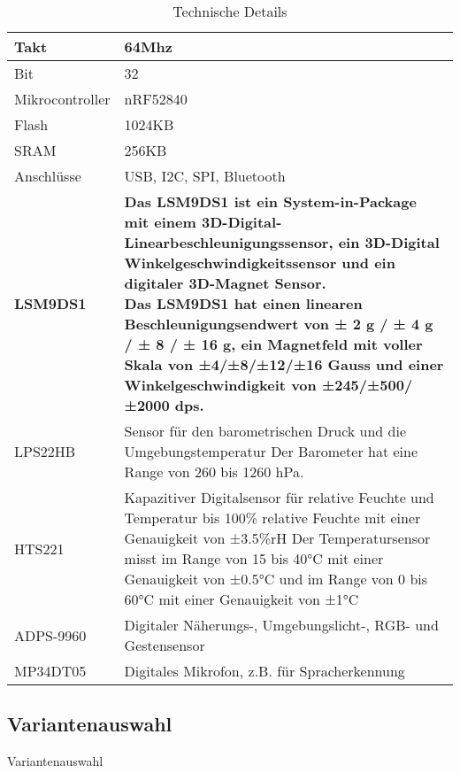 \begin{table}[H]
  \settowidth{}
  \setlength\extrarowheight{2pt}
  \begin{tabulary}{1.0\textwidth}{|L|L|}
    \hline
    Takt &
    64Mhz\\
    \hline
    Bit & 32 \\
    \hline
    Mikrocontroller& nRF52840 \\
    \hline
    Flash & 1024KB \\
    \hline
    SRAM&  256KB\\
    \hline
    Anschlüsse& USB, I2C, SPI, Bluetooth \\
    \hline
    \textbf{LSM9DS1}& \textbf{Das LSM9DS1 ist ein System-in-Package mit einem 3D-Digital-Linearbeschleunigungssensor, ein 3D-Digital Winkelgeschwindigkeitssensor und ein digitaler 3D-Magnet Sensor.\newline
    Das LSM9DS1 hat einen linearen Beschleunigungsendwert von ± 2 g / ± 4 g / ± 8 / ± 16 g, ein Magnetfeld mit voller Skala von ±4/±8/±12/±16 Gauss und einer Winkelgeschwindigkeit von ±245/±500/±2000 dps.
    } \\
    \hline
    LPS22HB& Sensor für den barometrischen Druck und die Umgebungstemperatur\newline
    Der Barometer hat eine Range von 260 bis 1260 hPa. 
     \\
    \hline
    HTS221 & Kapazitiver Digitalsensor für relative Feuchte und Temperatur bis 100\% relative Feuchte mit einer Genauigkeit von ±3.5\%rH\newline
    Der Temperatursensor misst im Range von 15 bis 40°C mit einer Genauigkeit von ±0.5°C und im Range von 0 bis 60°C mit einer Genauigkeit von ±1°C 
     \\
    \hline
    ADPS-9960& Digitaler Näherungs-, Umgebungslicht-, RGB- und Gestensensor \\
    \hline
    MP34DT05& Digitales Mikrofon, z.B. für Spracherkennung \\
    \hline
  \end{tabulary}
  \caption{Technische Details}
\end{table}


\subsection{Variantenauswahl}
Variantenauswahl

\newpage
